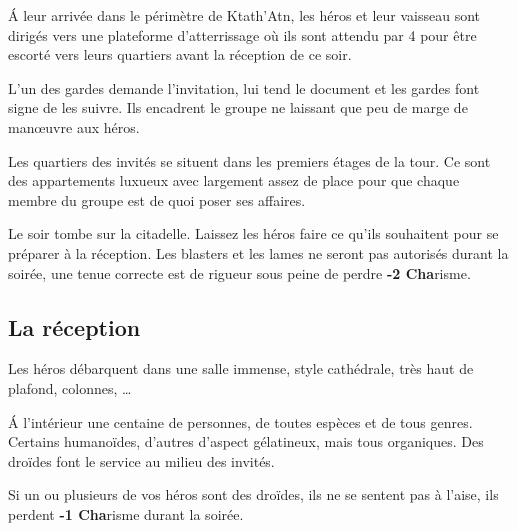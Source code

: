 \'A leur arrivée dans le périmètre de Ktath’Atn, les héros et leur vaisseau sont dirigés vers une plateforme d’atterrissage où ils sont attendu par 4  pour être escorté vers leurs quartiers avant la réception de ce soir.

L’un des gardes demande l’invitation,  lui tend le document et les gardes font signe de les suivre. Ils encadrent le groupe ne laissant que peu de marge de manœuvre aux héros.

Les quartiers des invités se situent dans les premiers étages de la tour. Ce sont des appartements luxueux avec largement assez de place pour que chaque membre du groupe est de quoi poser ses affaires.

Le soir tombe sur la citadelle. Laissez les héros faire ce qu’ils souhaitent pour se préparer à la réception. Les blasters et les lames ne seront pas autorisés durant la soirée, une tenue correcte est de rigueur sous peine de perdre \textbf{-2 Cha}risme. 

\subsection{La réception}

Les héros débarquent dans une salle immense, style cathédrale, très haut de plafond, colonnes, \dots

\'A l’intérieur une centaine de personnes, de toutes espèces et de tous genres. Certains humanoïdes, d’autres d’aspect gélatineux, mais tous organiques. Des droïdes font le service au milieu des invités. 

Si un ou plusieurs de vos héros sont des droïdes, ils ne se sentent pas à l’aise, ils perdent \textbf{-1 Cha}risme durant la soirée.

